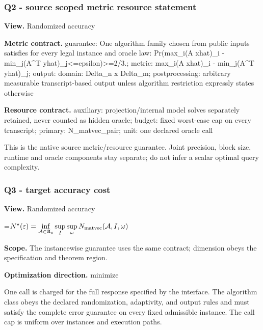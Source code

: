 \documentclass[10pt,a4paper]{article}
\newcommand{\AtlasMath}[1]{\par\begingroup\centering\setbox0=\hbox{$\displaystyle #1$}\ifdim\wd0>1.4\linewidth\typeout{ATLAS WIDE FORMULA: \the\wd0}\fi\ifdim\wd0>\linewidth\resizebox{\linewidth}{!}{\box0}\else\box0\fi\par\endgroup}
\begin{document}
\subsubsection{Q2 - source scoped metric resource statement}


\textbf{View.} Randomized accuracy



\textbf{Metric contract.} guarantee: One algorithm family chosen from public inputs satisfies for every legal instance and oracle law: Pr(max\_i(A xhat)\_i - min\_j(A\textasciicircum{}T yhat)\_j<=epsilon)>=2/3.; metric: max\_i(A xhat)\_i - min\_j(A\textasciicircum{}T yhat)\_j; output: domain: Delta\_n x Delta\_m; postprocessing: arbitrary measurable transcript-based output unless algorithm restriction expressly states otherwise



\textbf{Resource contract.} auxiliary: projection/internal model solves separately retained, never counted as hidden oracle; budget: fixed worst-case cap on every transcript; primary: N\_matvec\_pair; unit: one declared oracle call



This is the native source metric/resource guarantee. Joint precision, block size, runtime and oracle components stay separate; do not infer a scalar optimal query complexity.



\subsubsection{Q3 - target accuracy cost}


\textbf{View.} Randomized accuracy



\AtlasMath{N^\star(\varepsilon)=\inf_{\mathcal A\in\mathfrak A_\varepsilon}\sup_I \sup_\omega N_{\rm matvec}(\mathcal A,I,\omega)}


\textbf{Scope.} The instancewise guarantee uses the same contract; dimension obeys the specification and theorem region.



\textbf{Optimization direction.} minimize



One call is charged for the full response specified by the interface. The algorithm class obeys the declared randomization, adaptivity, and output rules and must satisfy the complete error guarantee on every fixed admissible instance. The call cap is uniform over instances and execution paths.
\end{document}
